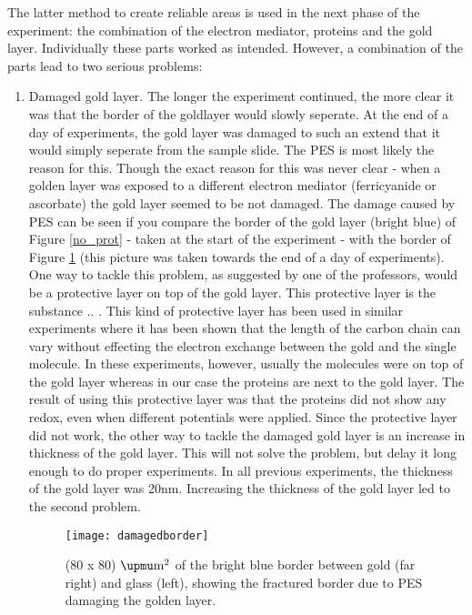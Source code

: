 \documentclass[twoside,single]{lion-msc}
\begin{document}
The latter method to create reliable areas is used in the next phase of the experiment: the combination of the electron mediator, proteins and the gold layer. Individually these parts worked as intended. However, a combination of the parts lead to two serious problems:
\begin{enumerate}


\item Damaged gold layer.
The longer the experiment continued, the more clear it was that the border of the goldlayer would slowly seperate. At the end of a day of experiments, the gold layer was damaged to such an extend that it would simply seperate from the sample slide. The PES is most likely the reason for this. Though the exact reason for this was never clear - when a golden layer was exposed to a different electron mediator (ferricyanide or ascorbate) the gold layer seemed to be not damaged. The damage caused by PES can be seen if you compare the border of the gold layer (bright blue) of Figure \ref{no_prot} - taken at the start of the experiment -  with the border of Figure \ref{damaged_border} (this picture was taken towards the end of a day of experiments). One way to tackle this problem, as suggested by one of the professors, would be a protective layer on top of the gold layer. This protective layer is the substance .. . This kind of protective layer has been used in similar experiments \cite{Elmalk2012} where it has been shown that the length of the carbon chain can vary without effecting the electron exchange between the gold and the single molecule. In these experiments, however, usually the molecules were on top of the gold layer whereas in our case the proteins are next to the gold layer. The result of using this protective layer was that the proteins did not show any redox, even when different potentials were applied. Since the protective layer did not work, the other way to tackle the damaged gold layer is an increase in thickness of the gold layer. This will not solve the problem, but delay it long enough to do proper experiments. In all previous experiments, the thickness of the gold layer was 20nm. Increasing the thickness of the gold layer led to the second problem.

 \begin{figure}[ht!]
\centering
\texttt{[image: damagedborder]}
\caption{(80 x 80) $\upmu \textup{m}^{2}$ of the bright blue border between gold (far right) and glass (left), showing the fractured border due to PES damaging the golden layer.}
\label{damaged_border}
\end{figure}


\end{enumerate}
\end{document}
